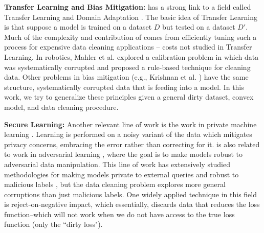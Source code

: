 \vspace{0.25em}

\noindent \textbf{Transfer Learning and Bias Mitigation: }  
\sys has a strong link to a field called Transfer Learning and Domain Adaptation \cite{pan2010survey}. The basic idea of Transfer Learning is that suppose a model is trained on a dataset $D$ but tested on a dataset $D'$. 
Much of the complexity and contribution of \sys comes from efficiently tuning such a process for expensive data cleaning applications -- costs not studied in Transfer Learning.
In robotics, Mahler et al. explored a calibration problem in which data was systematically corrupted \cite{DBLP:conf/case/MahlerKLSMKPWFAG14} and proposed a rule-based technique for cleaning data.
Other problems in bias mitigation (e.g., Krishnan et al. \cite{DBLP:conf/recsys/KrishnanPFG14}) have the same structure, systematically corrupted data that is feeding into a model.
In this work, we try to generalize these principles given a general dirty dataset, convex model, and data cleaning procedure.

\vspace{0.25em}

\noindent \textbf{Secure Learning: } Another relevant line of work is the work in private machine learning  \cite{wainwright2012privacy, duchi2013local}. Learning is performed on a noisy variant of the data which mitigates privacy concerns, embracing the error rather than correcting for it. \sys is also related to work in adversarial learning \cite{nelson2012query}, where the goal is to make models robust to adversarial data manipulation.
This line of work has extensively studied methodologies for making models private to external queries and robust to malicious labels \cite{xiaofeature}, but the data cleaning problem explores more general corruptions than just malicious labels.
One widely applied technique in this field is reject-on-negative impact, which essentially, discards data that reduces the loss function--which will not work when we do not have access to the true loss function (only the ``dirty loss"). 


